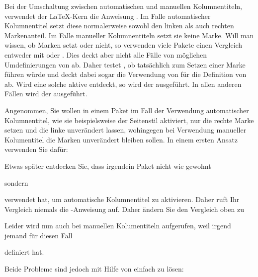 \begin{Declaration}
\end{Declaration}
Bei der Umschaltung zwischen automatischen
und manuellen Kolumnentiteln, verwendet der \LaTeX-Kern die Anweisung
.
Im Falle automatischer Kolumnentitel setzt diese normalerweise sowohl den
linken als auch rechten Markenanteil. Im Falle manueller Kolumnentiteln setzt
sie keine Marke. Will man wissen, ob  Marken
setzt oder nicht, so verwenden viele Pakete einen Vergleich entweder mit
 oder
. Dies deckt aber nicht alle Fälle von möglichen
Umdefinierungen von  ab. Daher testet
, ob  tatsächlich zum
Setzen einer Marke führen würde und deckt dabei sogar die Verwendung von
 für die Definition von  ab. Wird
eine solche aktive  entdeckt, so wird der
 ausgeführt. In allen anderen Fällen wird der
 ausgeführt.%
\begin{Example}
  Angenommen, Sie wollen in einem Paket im Fall der Verwendung automatischer
  Kolumnentitel, wie sie beispielsweise der Seitenstil
   aktiviert, nur die rechte
  Marke setzen und die linke unverändert lassen, wohingegen bei Verwendung
  manueller Kolumentitel die Marken unverändert bleiben sollen. In einem
  ersten Ansatz verwenden Sie dafür:
\begin{lstcode}
  \ifx\@mkboth\markboth {}\fi
\end{lstcode}
  Etwas später entdecken Sie, dass irgendein Paket nicht wie gewohnt
\begin{lstcode}
  \let\@mkboth\markboth
\end{lstcode}
  sondern
\begin{lstcode}
  \renewcommand{\@mkboth}{\markboth}
\end{lstcode}
  verwendet hat, um automatische Kolumnentitel zu aktivieren. Daher ruft Ihr
  Vergleich niemals die -Anweisung auf.  Daher
  ändern Sie den Vergleich oben zu
\begin{lstcode}
  \ifx\@mkboth\@gobbletwo
  \else {}\fi
\end{lstcode}
  Leider wird nun  auch bei manuellen
  Kolumentiteln aufgerufen, weil irgend jemand für diesen Fall
\begin{lstcode}
  \renewcommand{\@mkboth}[2]{%
    \typeout{DEBUG: ignoring running head setting}%
  }
\end{lstcode}
  definiert hat.

  Beide Probleme sind jedoch mit Hilfe von  einfach zu lösen:
\begin{lstcode}
\end{lstcode}%
\end{Example}
